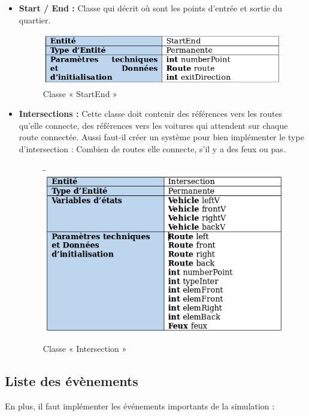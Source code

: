 \documentclass[12pt]{article} %
\begin{document}
\begin{itemize}
\item \textbf{Start / End :}
Classe qui décrit où sont les points d'entrée et sortie du quartier.

\begin{figure}[H]
	\centering
	\includegraphics[width=\linewidth]{StartEnd.png}
	\caption{Classe « StartEnd »}
	\label{fig:StartEnd}
\end{figure}

\item \textbf{Intersections :}
Cette classe doit contenir des références vers les routes qu’elle connecte, des références vers les voitures qui attendent sur chaque route connectée. Aussi faut-il créer un système pour bien implémenter le type d’intersection : Combien de routes elle connecte, s’il y a des feux ou pas. 

\begin{figure}[H]
	\centering
-	\includegraphics[width=\linewidth]{Intersection.png}
	\caption{Classe « Intersection »}
	\label{fig:Intersection}
\end{figure}

\end{itemize}

\subsection{Liste des évènements}
En plus, il faut implémenter les événements importants de la simulation : 
\end{document}
